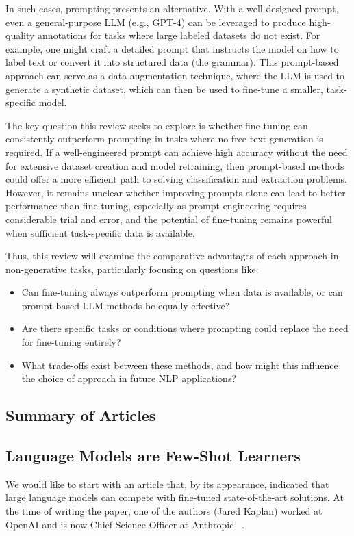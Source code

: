 \documentclass[11pt]{article}
\begin{document}
In such cases, prompting presents an alternative. With a well-designed prompt, even a general-purpose LLM (e.g., GPT-4) can be leveraged to produce high-quality annotations for tasks where large labeled datasets do not exist. For example, one might craft a detailed prompt that instructs the model on how to label text or convert it into structured data (the grammar). This prompt-based approach can serve as a data augmentation technique, where the LLM is used to generate a synthetic dataset, which can then be used to fine-tune a smaller, task-specific model.

The key question this review seeks to explore is whether fine-tuning can consistently outperform prompting in tasks where no free-text generation is required. If a well-engineered prompt can achieve high accuracy without the need for extensive dataset creation and model retraining, then prompt-based methods could offer a more efficient path to solving classification and extraction problems. However, it remains unclear whether improving prompts alone can lead to better performance than fine-tuning, especially as prompt engineering requires considerable trial and error, and the potential of fine-tuning remains powerful when sufficient task-specific data is available.

Thus, this review will examine the comparative advantages of each approach in non-generative tasks, particularly focusing on questions like:

\begin{itemize}
    \item Can fine-tuning always outperform prompting when data is available, or can prompt-based LLM methods be equally effective?
    \item Are there specific tasks or conditions where prompting could replace the need for fine-tuning entirely?
    \item What trade-offs exist between these methods, and how might this influence the choice of approach in future NLP applications?
\end{itemize}

\subsection{Summary of Articles}

\subsection{Language Models are Few-Shot Learners}
We would like to start with an article that, by its appearance, indicated that large language models can compete with fine-tuned state-of-the-art solutions. At the time of writing the paper, one of the authors (Jared Kaplan) worked at OpenAI and is now Chief Science Officer at Anthropic ~\cite{LMFSL:2020}.
\end{document}
